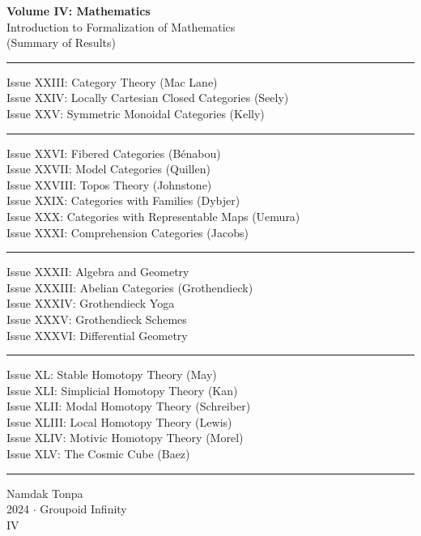 \documentclass{article}
\begin{document}
\begin{titlepage}
    \centering
    \vspace*{0.5in}
    \Huge
    \textbf{Volume IV: Mathematics} \\
    \LARGE
    Introduction to Formalization of Mathematics \\
    (Summary of Results) \\
    \vspace{1.5in}
    \small
    \flushleft
    \vspace{-2mm} \rule{\textwidth}{0.4pt}
    Issue XXIII: Category Theory (Mac Lane) \\
    Issue XXIV: Locally Cartesian Closed Categories (Seely) \\
    Issue XXV: Symmetric Monoidal Categories (Kelly) \\
    \vspace{-2mm} \rule{\textwidth}{0.4pt}
    Issue XXVI: Fibered Categories (Bénabou) \\
    Issue XXVII: Model Categories (Quillen) \\
    Issue XXVIII: Topos Theory (Johnstone) \\
    Issue XXIX: Categories with Families (Dybjer) \\
    Issue XXX: Categories with Representable Maps (Uemura) \\
    Issue XXXI: Comprehension Categories (Jacobs) \\
    \vspace{-2mm} \rule{\textwidth}{0.4pt}
    Issue XXXII: Algebra and Geometry \\
    Issue XXXIII: Abelian Categories (Grothendieck) \\
    Issue XXXIV: Grothendieck Yoga \\
    Issue XXXV: Grothendieck Schemes \\
    Issue XXXVI: Differential Geometry \\
    \vspace{-2mm} \rule{\textwidth}{0.4pt}
    Issue XL: Stable Homotopy Theory (May) \\
    Issue XLI: Simplicial Homotopy Theory (Kan) \\
    Issue XLII: Modal Homotopy Theory (Schreiber) \\
    Issue XLIII: Local Homotopy Theory (Lewis) \\
    Issue XLIV: Motivic Homotopy Theory (Morel) \\
    Issue XLV: The Cosmic Cube (Baez) \\
    \vspace{-2mm} \rule{\textwidth}{0.4pt}
    \centering
    \vfill
    \large
    Namdak Tonpa \\
    \Large
    2024 $\cdot$ Groupoid Infinity \\
    IV
\end{titlepage}
\end{document}
